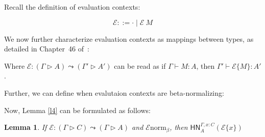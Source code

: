 \documentclass{article}
\newtheorem{lem}[thm]{Lemma}
\newcommand{\hasEF}[3]{\ensuremath{#1 \vdash #2 : #3}}
\newcommand{\hasC}[5]{\ensuremath{#1 : (#2 \rhd #3) \leadsto (#4 \rhd #5)}}
\newcommand{\bnorm}[1]{\ensuremath{#1 \mathrel{\text{norm}_\beta}}}
\newcommand{\hnorm}[3]{\ensuremath{\mathsf{HN}^{#1}_{#2}(#3)}}
\newcommand{\fillin}[2]{\ensuremath{#1\{#2\}}}
\newcommand{\fn}[2]{\ensuremath{#1 \to #2}}
\newcommand{\ap}[2]{\ensuremath{#1\ #2}}
\newcommand{\E}{\mathcal{E}}
\begin{document}
Recall the definition of evaluation contexts: 

\[
  \E ::= \cdot \mid \ap{\E}{M}
\]

We now further characterize evaluation contexts as mappings between types, as detailed in
Chapter~46 of~\cite{HarperBook2016}: 

Where \hasC{\E}{\Gamma}{A}{\Gamma'}{A'} can be read as if \hasEF{\Gamma}{M}{A}, then \hasEF{\Gamma'}{\fillin{\E}{M}}{A'}.

Further, we can define when evalutaion contexts are beta-normalizing:


Now, Lemma \ref{l4} can be formulated as follows:

\begin{lem}\label{l5}
If \hasC{\E}{\Gamma}{C}{\Gamma}{A} and \bnorm{\E},
then \hnorm{\Gamma, x : C}{A}{\fillin{\E}{x}}
\end{lem}
\end{document}
